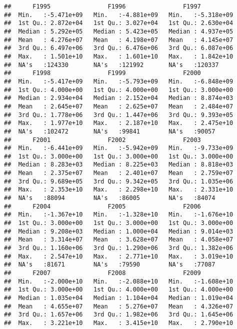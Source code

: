 \documentclass[
]{article}
\begin{document}
\begin{verbatim}
##      F1995                F1996                F1997           
##  Min.   :-5.471e+09   Min.   :-4.881e+09   Min.   :-5.318e+09  
##  1st Qu.: 2.872e+04   1st Qu.: 3.027e+04   1st Qu.: 2.630e+04  
##  Median : 5.292e+05   Median : 5.423e+05   Median : 4.937e+05  
##  Mean   : 4.276e+07   Mean   : 4.198e+07   Mean   : 4.145e+07  
##  3rd Qu.: 6.497e+06   3rd Qu.: 6.476e+06   3rd Qu.: 6.087e+06  
##  Max.   : 1.501e+10   Max.   : 1.601e+10   Max.   : 1.842e+10  
##  NA's   :124330       NA's   :121992       NA's   :120337      
##      F1998                F1999                F2000           
##  Min.   :-5.417e+09   Min.   :-5.793e+09   Min.   :-6.848e+09  
##  1st Qu.: 4.000e+00   1st Qu.: 4.000e+00   1st Qu.: 3.000e+00  
##  Median : 2.934e+04   Median : 2.152e+04   Median : 8.874e+03  
##  Mean   : 2.645e+07   Mean   : 2.625e+07   Mean   : 2.484e+07  
##  3rd Qu.: 1.778e+06   3rd Qu.: 1.447e+06   3rd Qu.: 9.393e+05  
##  Max.   : 1.977e+10   Max.   : 2.187e+10   Max.   : 2.475e+10  
##  NA's   :102472       NA's   :99841        NA's   :90057       
##      F2001                F2002                F2003           
##  Min.   :-6.441e+09   Min.   :-5.942e+09   Min.   :-9.733e+09  
##  1st Qu.: 3.000e+00   1st Qu.: 3.000e+00   1st Qu.: 3.000e+00  
##  Median : 8.283e+03   Median : 8.225e+03   Median : 8.818e+03  
##  Mean   : 2.375e+07   Mean   : 2.401e+07   Mean   : 2.759e+07  
##  3rd Qu.: 9.689e+05   3rd Qu.: 9.342e+05   3rd Qu.: 1.035e+06  
##  Max.   : 2.353e+10   Max.   : 2.298e+10   Max.   : 2.331e+10  
##  NA's   :88094        NA's   :86005        NA's   :84074       
##      F2004                F2005                F2006           
##  Min.   :-1.367e+10   Min.   :-1.328e+10   Min.   :-1.676e+10  
##  1st Qu.: 3.000e+00   1st Qu.: 3.000e+00   1st Qu.: 3.000e+00  
##  Median : 9.208e+03   Median : 1.000e+04   Median : 9.014e+03  
##  Mean   : 3.314e+07   Mean   : 3.628e+07   Mean   : 4.058e+07  
##  3rd Qu.: 1.160e+06   3rd Qu.: 1.290e+06   3rd Qu.: 1.382e+06  
##  Max.   : 2.547e+10   Max.   : 2.771e+10   Max.   : 3.019e+10  
##  NA's   :81671        NA's   :79590        NA's   :77087       
##      F2007                F2008                F2009           
##  Min.   :-2.000e+10   Min.   :-2.088e+10   Min.   :-1.608e+10  
##  1st Qu.: 3.000e+00   1st Qu.: 4.000e+00   1st Qu.: 4.000e+00  
##  Median : 1.035e+04   Median : 1.104e+04   Median : 1.019e+04  
##  Mean   : 4.655e+07   Mean   : 5.276e+07   Mean   : 4.326e+07  
##  3rd Qu.: 1.657e+06   3rd Qu.: 1.982e+06   3rd Qu.: 1.645e+06  
##  Max.   : 3.221e+10   Max.   : 3.415e+10   Max.   : 2.790e+10  

\end{verbatim}
\end{document}
